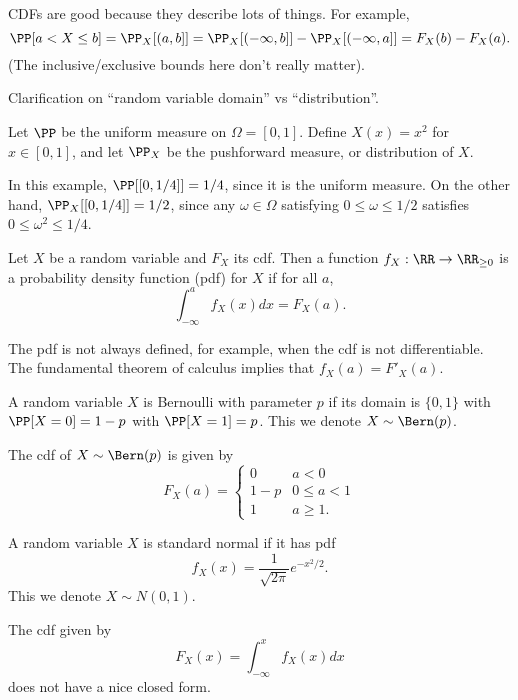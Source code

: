 CDFs are good because they describe lots of things. For example, 
\[\PP[a < X \leq b] = \PP_X[(a, b]] = \PP_X[(-\infty, b]] - \PP_X[(-\infty, a]] = 
F_X(b) - F_X(a).\]
(The inclusive/exclusive bounds here don't really matter). 

Clarification on ``random variable domain'' vs ``distribution''. 
\begin{example}
\exlabel

Let $\PP$ be the uniform measure on $\Omega = [0,1]$. Define $X(x) = x^2$ for $x\in [0,1]$, and let $\PP_X$ be the pushforward measure, or distribution of $X$. 
\end{example}

In this example, $\PP[[0, 1/4]] = 1/4$, since it is the uniform measure. On the other hand, $\PP_X[[0,1/4]] = 1/2$, since any $\omega\in \Omega$ satisfying $0\leq \omega \leq 1/2$ satisfies $0\leq \omega^2\leq 1/4$. 

\begin{definition}

Let $X$ be a random variable and $F_X$ its cdf. Then a function $f_X: \RR\rightarrow \RR_{\geq 0}$ is a \ac{probability density function} (pdf) for $X$ if for all $a$, 
\[\int_{-\infty}^a f_X{(x)} dx = F_X(a).\]
\end{definition}

The pdf is not always defined, for example, when the cdf is not differentiable. The fundamental theorem of calculus implies that $f_X(a) = F'_X(a)$. 

\begin{example}
\exlabel

A random variable $X$ is \ac{Bernoulli} with parameter $p$ if its domain is $\{0,1\}$ with $\PP[X=0] = 1-p$ with $\PP[X=1] = p$. This we denote $X\sim \Bern(p)$. 
\end{example}

The cdf of $X\sim \Bern(p)$ is given by 
\[F_X(a) = \begin{cases}0 & a < 0 \\ 1-p & 0\leq a < 1 \\ 1 & a\geq 1.\end{cases}\]

\begin{example}
\exlabel

A random variable $X$ is \ac{standard normal} if it has pdf 
\[f_X(x) = \frac{1}{\sqrt{2\pi}}e^{-x^2/2}.\]
This we denote $X\sim N(0,1)$. 
\end{example}

The cdf given by 
\[F_X(x) = \int_{-\infty}^x f_X(x) dx\]
does not have a nice closed form.

